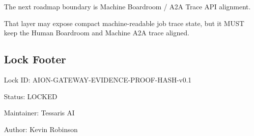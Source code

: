 The next roadmap boundary is Machine Boardroom / A2A Trace API alignment.

That layer may expose compact machine-readable job trace state, but it MUST keep the Human Boardroom and Machine A2A trace aligned.

\subsection{Lock Footer}

Lock ID: AION-GATEWAY-EVIDENCE-PROOF-HASH-v0.1

Status: LOCKED

Maintainer: Tessaris AI

Author: Kevin Robinson
